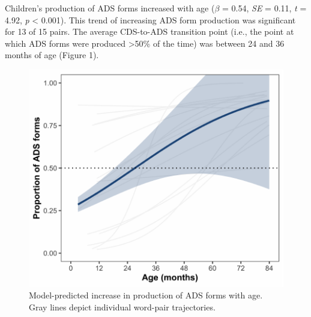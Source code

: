 \documentclass[10pt, letterpaper]{article}
\newenvironment{CodeChunk}{}{}
\begin{document}
Children's production of ADS forms increased with age (\(\beta\) = 0.54,
\emph{SE} = 0.11, \emph{t} = 4.92, \emph{p} \textless{} 0.001). This
trend of increasing ADS form production was significant for 13 of 15
pairs. The average CDS-to-ADS transition point (i.e., the point at which
ADS forms were produced \textgreater50\% of the time) was between 24 and
36 months of age (Figure 1).

\begin{CodeChunk}
\begin{figure}[h]

{\centering \includegraphics{figs/shift-timing-fig-1} 

}

\caption[Model-predicted increase in production of ADS forms with age]{Model-predicted increase in production of ADS forms with age. Gray lines depict individual word-pair trajectories.}\label{fig:shift-timing-fig}
\end{figure}
\end{CodeChunk}
\end{document}

